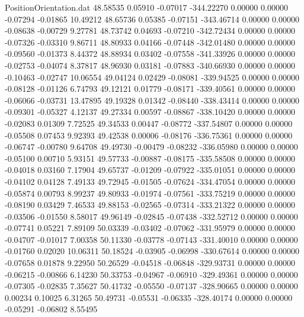 \begin{filecontents}{PositionOrientation.dat}
  48.58535    0.05910   -0.07017  -344.22270    0.00000    0.00000   -0.07294   -0.01865   10.49212
  48.65736    0.05385   -0.07151  -343.46714    0.00000    0.00000   -0.08638   -0.00729    9.27781
  48.73742    0.04693   -0.07210  -342.72434    0.00000    0.00000   -0.07326   -0.03310    9.86711
  48.80933    0.04166   -0.07448  -342.01480    0.00000    0.00000   -0.09560   -0.01373    8.44372
  48.88934    0.03402   -0.07558  -341.33926    0.00000    0.00000   -0.02753   -0.04074    8.37817
  48.96930    0.03181   -0.07883  -340.66930    0.00000    0.00000   -0.10463   -0.02747   10.06554
  49.04124    0.02429   -0.08081  -339.94525    0.00000    0.00000   -0.08128   -0.01126    6.74793
  49.12121    0.01779   -0.08171  -339.40561    0.00000    0.00000   -0.06066   -0.03731   13.47895
  49.19328    0.01342   -0.08440  -338.43414    0.00000    0.00000   -0.09301   -0.05327    4.12137
  49.27334    0.00597   -0.08867  -338.10420    0.00000    0.00000   -0.02083    0.01309    7.72525
  49.34533    0.00447   -0.08772  -337.54807    0.00000    0.00000   -0.05508    0.07453    9.92393
  49.42538    0.00006   -0.08176  -336.75361    0.00000    0.00000   -0.06747   -0.00780    9.64708
  49.49730   -0.00479   -0.08232  -336.05980    0.00000    0.00000   -0.05100    0.00710    5.93151
  49.57733   -0.00887   -0.08175  -335.58508    0.00000    0.00000   -0.04018    0.03160    7.17904
  49.65737   -0.01209   -0.07922  -335.01051    0.00000    0.00000   -0.04102    0.04128    7.49133
  49.72945   -0.01505   -0.07624  -334.47054    0.00000    0.00000   -0.05874    0.00793    8.99237
  49.80933   -0.01974   -0.07561  -333.75219    0.00000    0.00000   -0.08190    0.03429    7.46533
  49.88153   -0.02565   -0.07314  -333.21322    0.00000    0.00000   -0.03506   -0.01550    8.58017
  49.96149   -0.02845   -0.07438  -332.52712    0.00000    0.00000   -0.07741    0.05221    7.89109
  50.03339   -0.03402   -0.07062  -331.95979    0.00000    0.00000   -0.04707   -0.01017    7.00358
  50.11330   -0.03778   -0.07143  -331.40010    0.00000    0.00000   -0.01760    0.02020   10.06311
  50.18524   -0.03905   -0.06998  -330.67614    0.00000    0.00000   -0.07658    0.01878    9.22950
  50.26529   -0.04518   -0.06848  -329.93731    0.00000    0.00000   -0.06215   -0.00866    6.14230
  50.33753   -0.04967   -0.06910  -329.49361    0.00000    0.00000   -0.07305   -0.02835    7.35627
  50.41732   -0.05550   -0.07137  -328.90665    0.00000    0.00000    0.00234    0.10025    6.31265
  50.49731   -0.05531   -0.06335  -328.40174    0.00000    0.00000   -0.05291   -0.06802    8.55495

\end{filecontents}
